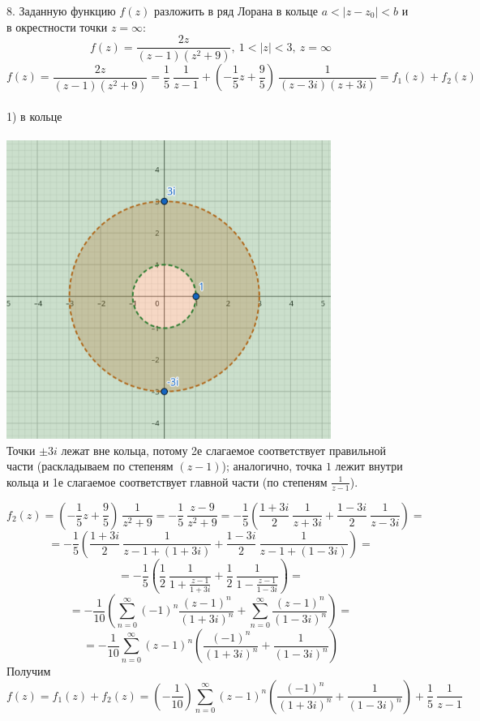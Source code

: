 \documentclass[14pt]{extarticle}
\begin{document}
8. Заданную функцию $f(z)$ разложить в ряд Лорана в кольце
$a < |z-z_0| < b$ и в окрестности точки $z=\infty$:
$$f(z)=\frac{2z}{(z-1)(z^2+9)}, \ 1<|z|<3, \ z=\infty$$
$$f(z)=\frac{2z}{(z-1)(z^2+9)}=\frac{1}{5} \ \frac{1}{z-1}+
\left(-\frac{1}{5}z+\frac{9}{5}\right) \ \frac{1}{(z-3i)(z+3i)}
= f_1(z)+f_2(z)$$ \\
1) в кольце \\\\
\includegraphics[width=300pt]{img4.png} \\
Точки $\pm 3i$ лежат вне кольца, потому 2е слагаемое соответствует
правильной части (раскладываем по степеням $(z-1)$); 
аналогично, точка $1$ лежит внутри кольца и 
1е слагаемое соответствует главной части (по степеням $\frac{1}{z-1}$). 

$$f_2(z) = \left(-\frac{1}{5}z+\frac{9}{5}\right) \ \frac{1}{z^2+9}=
-\frac{1}{5} \ \frac{z-9}{z^2+9}=-\frac{1}{5} 
\left(\frac{1+3i}{2} \ \frac{1}{z+3i} 
+ \frac{1-3i}{2} \ \frac{1}{z-3i}\right)=$$
$$= -\frac{1}{5} 
\left(\frac{1+3i}{2} \ \frac{1}{z - 1 + (1+3i)} 
+ \frac{1-3i}{2} \ \frac{1}{z - 1 + (1-3i)}\right)=$$
$$= -\frac{1}{5} 
\left(\frac{1}{2} \ \frac{1}{1+\frac{z - 1}{1+3i}} 
+ \frac{1}{2} \ \frac{1}{1-\frac{z-1}{1-3i}}\right)=$$
$$= -\frac{1}{10}\left(\sum_{n=0}^{\infty}(-1)^n
\frac{(z-1)^n}{(1+3i)^n}+\sum_{n=0}^{\infty}
\frac{(z-1)^n}{(1-3i)^n}\right)=$$
$$= -\frac{1}{10}\sum_{n=0}^{\infty}(z-1)^n\left(
\frac{(-1)^n}{(1+3i)^n}+\frac{1}{(1-3i)^n}\right)$$
Получим\\
$$f(z) = f_1(z) + f_2(z) = 
\left(-\frac{1}{10}\right)\sum_{n=0}^{\infty}(z-1)^n\left(
\frac{(-1)^n}{(1+3i)^n}+\frac{1}{(1-3i)^n}\right) 
+ \frac{1}{5} \ \frac{1}{z-1}$$
\end{document}
